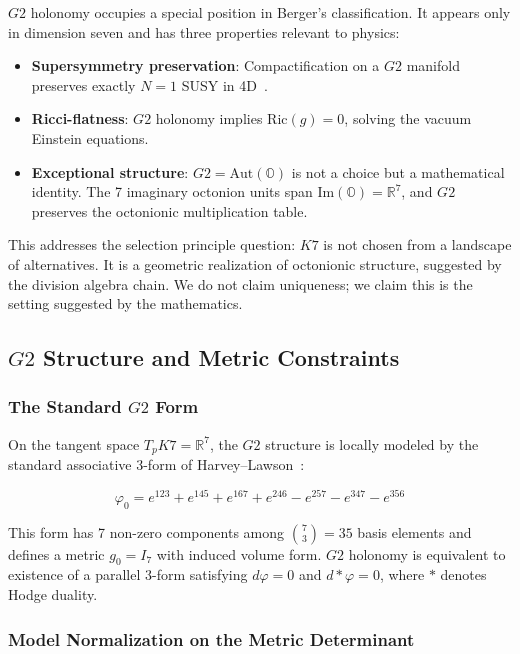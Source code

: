 \documentclass[11pt,a4paper]{article}
\newcommand{\Gtwo}{\mathrm{G}_2}
\newcommand{\Kseven}{K_7}
\def\Gtwo{G2}%
\def\Kseven{K7}%
\begin{document}
$\Gtwo$ holonomy occupies a special position in Berger's classification. It appears only in dimension seven and has three properties relevant to physics:

\begin{itemize}
\item \textbf{Supersymmetry preservation}: Compactification on a $\Gtwo$ manifold preserves exactly $N=1$ SUSY in 4D~\cite{acharya2004}.
\item \textbf{Ricci-flatness}: $\Gtwo$ holonomy implies $\mathrm{Ric}(g) = 0$, solving the vacuum Einstein equations.
\item \textbf{Exceptional structure}: $\Gtwo = \mathrm{Aut}(\mathbb{O})$ is not a choice but a mathematical identity. The 7 imaginary octonion units span $\mathrm{Im}(\mathbb{O}) = \mathbb{R}^7$, and $\Gtwo$ preserves the octonionic multiplication table.
\end{itemize}

This addresses the selection principle question: $\Kseven$ is not chosen from a landscape of alternatives. It is a geometric realization of octonionic structure, suggested by the division algebra chain. We do not claim uniqueness; we claim this is the setting suggested by the mathematics.

\subsection{$\Gtwo$ Structure and Metric Constraints}

\subsubsection{The Standard $\Gtwo$ Form}

On the tangent space $T_p \Kseven = \mathbb{R}^7$, the $\Gtwo$ structure is locally modeled by the standard associative 3-form of Harvey--Lawson~\cite{harvey1982}:

$$\varphi_0 = e^{123} + e^{145} + e^{167} + e^{246} - e^{257} - e^{347} - e^{356}$$

This form has 7 non-zero components among $\binom{7}{3} = 35$ basis elements and defines a metric $g_0 = I_7$ with induced volume form. $\Gtwo$ holonomy is equivalent to existence of a parallel 3-form satisfying $d\varphi = 0$ and $d{*}\varphi = 0$, where $*$ denotes Hodge duality.

\subsubsection{Model Normalization on the Metric Determinant}
\end{document}
